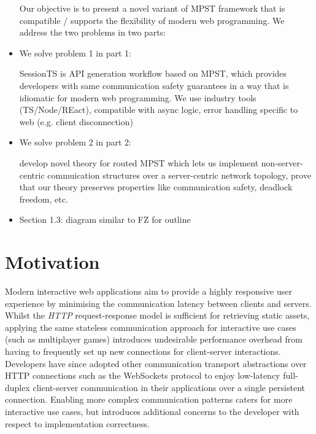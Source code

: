 \begin{itemize}
Our objective is to present a novel variant of MPST framework
that is compatible / supports the flexibility of modern web programming.
We address the two problems in two parts:

\item We solve problem 1 in part 1: 

SessionTS is API generation workflow based on MPST, which
provides developers with same communication safety guarantees in a way that is idiomatic for modern web programming. We use industry tools (TS/Node/REact), compatible with async logic, error handling specific to web (e.g. client disconnection)

\item We solve problem 2 in part 2:

develop novel theory for routed MPST which lets us implement non-server-centric commuication structures over a server-centric network topology, prove
that our theory preserves properties like communication safety, deadlock freedom, etc.

\item Section 1.3: diagram similar to FZ for outline

\end{itemize}



\section{Motivation}
\label{section:intro}

Modern interactive web applications aim to 
provide a highly responsive user experience by 
minimising the communication latency between clients and servers. 
Whilst the \textit{HTTP} request-response model is 
sufficient for retrieving static assets, applying the same 
stateless communication approach for interactive use cases 
(such as multiplayer games) introduces undesirable 
performance overhead from having to frequently set up 
new connections for client-server interactions. 
Developers have since adopted other communication 
transport abstractions over HTTP connections such as the WebSockets protocol \cite{WebSocketRFC} to enjoy low-latency full-duplex 
client-server communication in their applications over 
a single persistent connection. 
Enabling more complex communication patterns caters for 
more interactive use cases, but introduces additional 
concerns to the developer with respect to implementation correctness.

